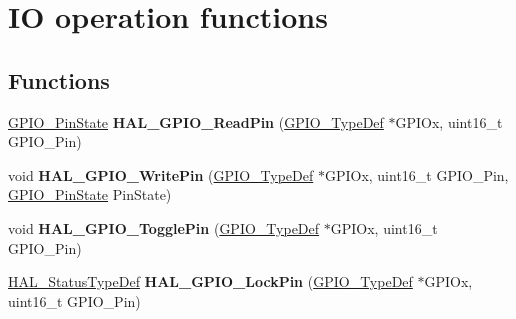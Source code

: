 \hypertarget{group___g_p_i_o___exported___functions___group2}{}\section{IO operation functions}
\label{group___g_p_i_o___exported___functions___group2}
\subsection*{Functions}
\begin{DoxyCompactItemize}
\item 
\mbox{\label{group___g_p_i_o___exported___functions___group2_gaf2b819ea6551319ddd5670db318d2e4e}} 
\hyperlink{group___g_p_i_o___exported___types_ga5b3ef0486b179415581eb342e0ea6b43}{G\+P\+I\+O\+\_\+\+Pin\+State} {\bfseries H\+A\+L\+\_\+\+G\+P\+I\+O\+\_\+\+Read\+Pin} (\hyperlink{struct_g_p_i_o___type_def}{G\+P\+I\+O\+\_\+\+Type\+Def} $\ast$G\+P\+I\+Ox, uint16\+\_\+t G\+P\+I\+O\+\_\+\+Pin)
\item 
\mbox{\label{group___g_p_i_o___exported___functions___group2_gaf4b97bdf533a02f51ef696d43b6da5c4}} 
void {\bfseries H\+A\+L\+\_\+\+G\+P\+I\+O\+\_\+\+Write\+Pin} (\hyperlink{struct_g_p_i_o___type_def}{G\+P\+I\+O\+\_\+\+Type\+Def} $\ast$G\+P\+I\+Ox, uint16\+\_\+t G\+P\+I\+O\+\_\+\+Pin, \hyperlink{group___g_p_i_o___exported___types_ga5b3ef0486b179415581eb342e0ea6b43}{G\+P\+I\+O\+\_\+\+Pin\+State} Pin\+State)
\item 
\mbox{\label{group___g_p_i_o___exported___functions___group2_gaf5e0c89f752de5cdedcc30db068133f6}} 
void {\bfseries H\+A\+L\+\_\+\+G\+P\+I\+O\+\_\+\+Toggle\+Pin} (\hyperlink{struct_g_p_i_o___type_def}{G\+P\+I\+O\+\_\+\+Type\+Def} $\ast$G\+P\+I\+Ox, uint16\+\_\+t G\+P\+I\+O\+\_\+\+Pin)
\item 
\mbox{\label{group___g_p_i_o___exported___functions___group2_gad03c868b4a4fb25883c1bb86d0c7e9ca}} 
\hyperlink{stm32f0xx__hal__def_8h_a63c0679d1cb8b8c684fbb0632743478f}{H\+A\+L\+\_\+\+Status\+Type\+Def} {\bfseries H\+A\+L\+\_\+\+G\+P\+I\+O\+\_\+\+Lock\+Pin} (\hyperlink{struct_g_p_i_o___type_def}{G\+P\+I\+O\+\_\+\+Type\+Def} $\ast$G\+P\+I\+Ox, uint16\+\_\+t G\+P\+I\+O\+\_\+\+Pin)

\end{DoxyCompactItemize}
